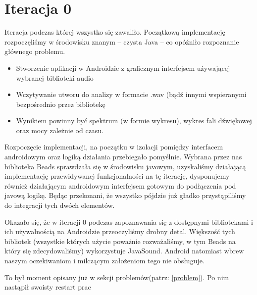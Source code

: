 \section{Iteracja 0}
Iteracja podczas której wszystko się zawaliło. Początkową implementację rozpoczęliśmy w środowisku
znanym -- czysta Java -- co opóźniło rozpoznanie głównego problemu.

\begin{Note}


\begin{itemize}
    \item Stworzenie aplikacji w Androidzie z graficznym interfejsem używającej wybranej biblioteki audio
    \item Wczytywanie utworu do analizy w formacie .wav (bądź innymi wspieranymi bezpośrednio przez bibliotekę
    \item Wynikiem powinny być spektrum (w formie wykresu), wykres fali dźwiękowej oraz mocy zależnie od czasu.
\end{itemize}


Rozpoczęcie implementacji, na początku w izolacji pomiędzy interfacem androidowym oraz logiką działania przebiegało pomyślnie. Wybrana przez nas biblioteka Beads sprawdzała się w środowisku javowym, uzyskaliśmy działającą implementację przewidywanej funkcjonalności na tę iterację, dysponujemy również działającym androidowym interfejsem gotowym do podłączenia pod javową logikę. Będąc przekonani, że wszystko pójdzie już gładko przystąpiliśmy do integracji tych dwóch elementów.


Okazało się, że w iteracji 0 podczas zapoznawania się z dostępnymi bibliotekami i ich używalnością na Androidzie przeoczyliśmy drobny detal. Większość tych bibliotek (wszystkie których użycie poważnie rozważaliśmy, w tym Beads na który się zdecydowaliśmy) wykorzystuje JavaSound. Android natomiast wbrew naszym oczekiwaniom i milczącym założeniom tego nie obsługuje.

\end{Note}

To był moment opisany już w sekcji problemów(patrz: \ref{problem}). Po nim nastąpił swoisty restart prac
